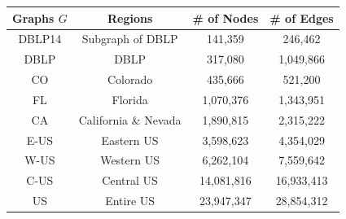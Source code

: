 \begin{table}[t!]
\begin{center}
\begin{tabular}{|c||c|c|c|}
{\bf Graphs $G$} &  {\bf Regions} &  {\bf \# of Nodes} &   {\bf \# of Edges}\\
\hline\hline
DBLP14      &   Subgraph of DBLP          & 141,359  &   246,462  \\ \hline%
DBLP        & DBLP                        & 317,080 & 1,049,866    \\ \hline%
CO          &  Colorado              & 435,666      &  521,200      \\ \hline%
FL          &  Florida               & 1,070,376    &  1,343,951     \\ \hline%
CA          &  California \& Nevada   & 1,890,815   &  2,315,222      \\ \hline%
E-US        &  Eastern US            & 3,598,623    &  4,354,029     \\ \hline%
W-US        &  Western US            & 6,262,104    &  7,559,642      \\ \hline%
C-US        &  Central US            & 14,081,816   &  16,933,413    \\ \hline%
US          &  Entire US             & 23,947,347   &  28,854,312     \\ \hline%
\end{tabular}
\end{center}
\vspace{-3ex}
\end{table}




